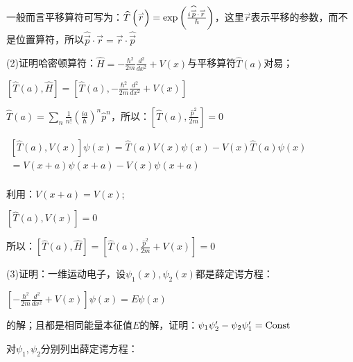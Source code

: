 一般而言平移算符可写为：$\widehat T\left( {\mathord{\buildrel{\lower3pt\hbox{$\scriptscriptstyle\rightharpoonup$}}
\over r} } \right) = \exp \left( {\frac{{i\widehat{\mathord{\buildrel{\lower3pt\hbox{$\scriptscriptstyle\rightharpoonup$}}
\over p} } \cdot \mathord{\buildrel{\lower3pt\hbox{$\scriptscriptstyle\rightharpoonup$}}
\over r} }}{\hbar }} \right)$，这里$\vec r$表示平移的参数，而不是位置算符，所以$\widehat{\vec p} \cdot \vec r = \vec r \cdot \widehat{\vec p}$

(2)证明哈密顿算符：$\hat H =  - \frac{{\hbar ^2 }}{{2m}}\frac{{d^2 }}{{dx^2 }} + V\left( x \right)$与平移算符$\widehat T(a)$对易；

$\left[ {\widehat T\left( a \right),\widehat H} \right] = \left[ {\widehat T\left( a \right), - \frac{{\hbar ^2 }}{{2m}}\frac{{d^2 }}{{dx^2 }} + V\left( x \right)} \right]$

$\widehat T\left( a \right) = \sum\limits_n {\frac{1}{{n!}}\left( {\frac{{ia}}{\hbar }} \right)} ^n \widehat p^n $，所以：$\left[ {\widehat T(a),\frac{{\widehat p^2 }}{{2m}}} \right] = 0$

$\begin{array}{l}
 \left[ {\widehat T(a),V(x)} \right]\psi (x) = \widehat T(a)V(x)\psi (x) - V(x)\widehat T(a)\psi (x) \\
  = V\left( {x + a} \right)\psi \left( {x + a} \right) - V\left( x \right)\psi \left( {x + a} \right) \\
 \end{array}$

利用：$V(x + a) = V(x)$;

$\left[ {\widehat T\left( a \right),V\left( x \right)} \right] = 0$

所以：$\left[ {\widehat T\left( a \right),\widehat H} \right] = \left[ {\widehat T\left( a \right),\frac{{\widehat p^2 }}{{2m}} + V\left( x \right)} \right] = 0$


(3)证明：一维运动电子，设$\psi _1 \left( x \right),\psi _2 \left( x \right)$都是薛定谔方程：

\begin{center}
$\left[ { - \frac{{\hbar ^2 }}{{2m}}\frac{{d^2 }}{{dx^2 }} + V\left( x \right)} \right]\psi \left( x \right) = E\psi \left( x \right)$
\end{center}

的解；且都是相同能量本征值$E$的解，证明：$\psi _1 \psi _2 ^\prime   - \psi _2 \psi _1 ^\prime   = {\rm{Const}}$

对$\psi _1, \psi _2$分别列出薛定谔方程：

